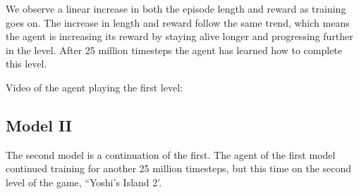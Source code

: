 \documentclass[a4paper]{article}
\begin{document}
We observe a linear increase in both the episode length and reward as training goes on.
The increase in length and reward follow the same trend, which means the agent is increasing its reward by staying alive longer and progressing further in the level.
After 25 million timesteps the agent has learned how to complete this level.

\bigbreak \noindent Video of the agent playing the first level: \href{https://user-images.githubusercontent.com/17729237/187476061-c6c80b38-291d-4d32-b37c-6c923a414eeb.mp4}{\color{blue}{Yoshi's Island 1}}

\subsection{Model II}
The second model is a continuation of the first.
The agent of the first model continued training for another 25 million timesteps, but this time on the second level of the game, ``Yoshi's Island 2'.
\end{document}
